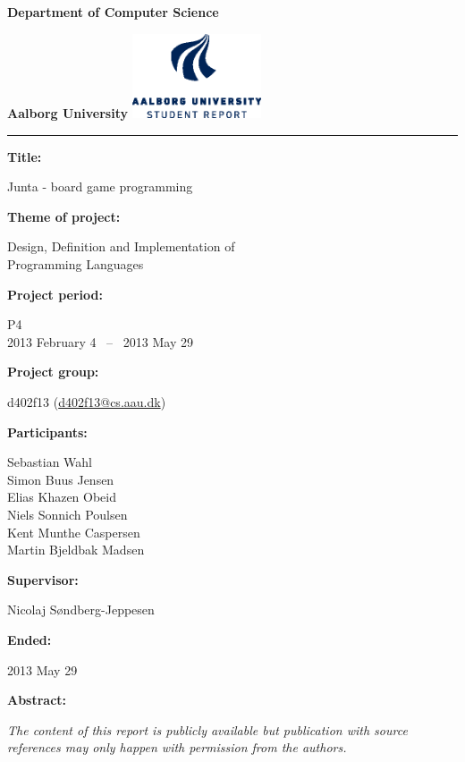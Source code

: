 \begin{nopagebreak}
  \begin{minipage}{\textwidth}
    \vspace{2cm}
\LARGE{\textbf{Department of Computer Science}}\vspace{-2.1cm}

\large{\textbf{Aalborg University}}
\hspace{8.30cm}\includegraphics[height=2.5cm]{pictures/aau_logo_en_blue.eps}
\end{minipage}
\vspace{0.1cm}
\hrule

\newcommand{\titleitem}[2]{\textbf{#1:}

\hspace*{0.5cm}
\begin{minipage}{0.9\columnwidth}#2\end{minipage}
\vspace{0.25cm}}
\begin{multicols}{2}

\titleitem{Title}{Junta - board game programming}

\titleitem{Theme of project}{Design, Definition and Implementation of \\Programming Languages}

\titleitem{Project period}{P4\\2013 February 4 ~--~ 2013 May 29}

\titleitem{Project group}{d402f13 (\url{d402f13@cs.aau.dk})}

\titleitem{Participants}{
    Sebastian Wahl\\
    Simon Buus Jensen\\
    Elias Khazen Obeid\\
    Niels Sonnich Poulsen\\
    Kent Munthe Caspersen\\
    Martin Bjeldbak Madsen
}

\titleitem{Supervisor}{Nicolaj Søndberg-Jeppesen}

\titleitem{Ended}{2013 May 29}

\vfill
\columnbreak

\titleitem{Abstract}{}

\end{multicols}
\vfill
\centering
\textit{The content of this report is publicly available but publication with source references may only happen with permission from the authors.}
\end{nopagebreak}
